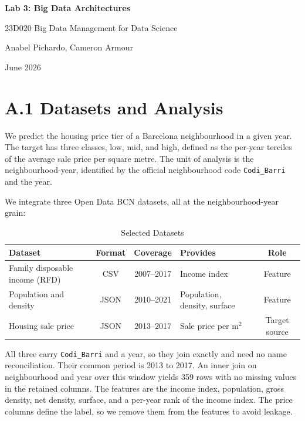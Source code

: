 \documentclass[11pt]{article}
\begin{document}
\begin{center}
    {\Large\bfseries\color{bseblue} Lab 3: Big Data Architectures \par}
    \vspace{0.1em}
    {\large 23D020 Big Data Management for Data Science \par}
    \vspace{0.1em}
    {\normalsize Anabel Pichardo, Cameron Armour \par}
    \vspace{0.1em}
    {\normalsize\color{lightgraytext} June 2026 \par}
\end{center}

\vspace{-0.5em}

\section*{A.1 Datasets and Analysis}

We predict the housing price tier of a Barcelona neighbourhood in a given year. The target has three classes, low, mid, and high, defined as the per-year terciles of the average sale price per square metre. The unit of analysis is the neighbourhood-year, identified by the official neighbourhood code \texttt{Codi\_Barri} and the year.

We integrate three Open Data BCN datasets, all at the neighbourhood-year grain:

\begin{table}[H]
\centering
\begin{tabularx}{0.95\textwidth}{@{} l c c Y c @{}}
\toprule
\textbf{Dataset} & \textbf{Format} & \textbf{Coverage} & \textbf{Provides} & \textbf{Role} \tabularnewline
\midrule
Family disposable income (RFD) & CSV & 2007--2017 & Income index & Feature \tabularnewline
Population and density & JSON & 2010--2021 & Population, density, surface & Feature \tabularnewline
Housing sale price & JSON & 2013--2017 & Sale price per m$^2$ & Target source \tabularnewline
\bottomrule
\end{tabularx}
\caption{Selected Datasets}
\end{table}
\vspace{-0.5em}
All three carry \texttt{Codi\_Barri} and a year, so they join exactly and need no name reconciliation. Their common period is 2013 to 2017. An inner join on neighbourhood and year over this window yields 359 rows with no missing values in the retained columns. The features are the income index, population, gross density, net density, surface, and a per-year rank of the income index. The price columns define the label, so we remove them from the features to avoid leakage.
\end{document}
